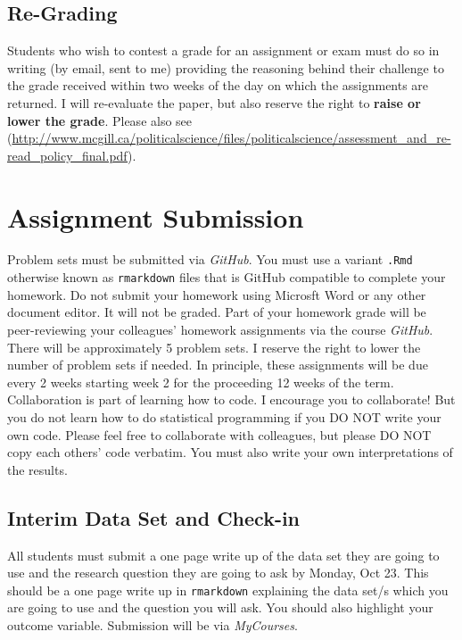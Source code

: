 \documentclass[11pt,]{article}
\begin{document}
\subsection{Re-Grading}\label{re-grading}

Students who wish to contest a grade for an assignment or exam must do
so in writing (by email, sent to me) providing the reasoning behind
their challenge to the grade received within two weeks of the day on
which the assignments are returned. I will re-evaluate the paper, but
also reserve the right to \textbf{raise or lower the grade}. Please also
see
(\url{http://www.mcgill.ca/politicalscience/files/politicalscience/assessment_and_re-read_policy_final.pdf}).

\section{Assignment Submission}\label{assignment-submission}

Problem sets must be submitted via \emph{GitHub}. You must use a variant
\texttt{.Rmd} otherwise known as \texttt{rmarkdown} files that is GitHub
compatible to complete your homework. Do not submit your homework using
Microsft Word or any other document editor. It will not be graded. Part
of your homework grade will be peer-reviewing your colleagues' homework
assignments via the course \emph{GitHub}. There will be approximately 5
problem sets. I reserve the right to lower the number of problem sets if
needed. In principle, these assignments will be due every 2 weeks
starting week 2 for the proceeding 12 weeks of the term. Collaboration
is part of learning how to code. I encourage you to collaborate! But you
do not learn how to do statistical programming if you DO NOT write your
own code. Please feel free to collaborate with colleagues, but please DO
NOT copy each others' code verbatim. You must also write your own
interpretations of the results.

\subsection{Interim Data Set and
Check-in}\label{interim-data-set-and-check-in}

All students must submit a one page write up of the data set they are
going to use and the research question they are going to ask by Monday,
Oct 23. This should be a one page write up in \texttt{rmarkdown}
explaining the data set/s which you are going to use and the question
you will ask. You should also highlight your outcome variable.
Submission will be via \emph{MyCourses}.
\end{document}
